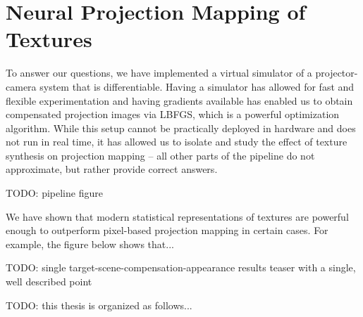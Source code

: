 \section{Neural Projection Mapping of Textures}
\label{section:intro-neural_projection_mapping}

To answer our questions, we have implemented a virtual simulator of a projector-camera system that is differentiable. Having a simulator has allowed for fast and flexible experimentation and having gradients available has enabled us to obtain compensated projection images via LBFGS, which is a powerful optimization algorithm. While this setup cannot be practically deployed in hardware and does not run in real time, it has allowed us to isolate and study the effect of texture synthesis on projection mapping -- all other parts of the pipeline do not approximate, but rather provide correct answers.

{\color{red} TODO: pipeline figure}

We have shown that modern statistical representations of textures are powerful enough to outperform pixel-based projection mapping in certain cases. For example, the figure below shows that...

{\color{red} TODO: single target-scene-compensation-appearance results teaser with a single, well described point}

{\color{red} TODO: this thesis is organized as follows...}
